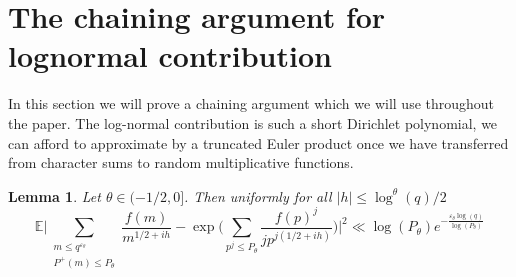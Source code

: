 \documentclass[10pt,a4paper]{amsart}
\newtheorem{lemma}{Lemma}
\numberwithin{equation}{section}
\begin{document}
\section{The chaining argument for lognormal contribution} \label{chain_arg}
In this section we will prove a chaining argument which we will use throughout the paper. The log-normal contribution is such a short Dirichlet polynomial, we can afford to approximate by a truncated Euler product once we have transferred from character sums to random multiplicative functions. 
\begin{lemma}
    Let $\theta \in (-1/2,0]$. Then uniformly for all $|h| \leq \log^{\theta}(q)/2$
    \begin{equation}
        \mathbb{E}\big|\sum_{\substack{m \leq q^{\varepsilon_\theta} \\ P^+(m) \leq P_\theta}}\frac{f(m)}{m^{1/2+ih}} - \exp\big(\sum_{p^j \leq P_\theta}\frac{f(p)^j}{jp^{j(1/2+ih)}}\big)\big|^2\ll \log(P_\theta)e^{-\frac{\varepsilon_\theta \log(q)}{\log(P_\theta)}} \label{exp_log_eq}
    \end{equation} 
    \label{exp_logn}
\end{lemma}
\end{document}
